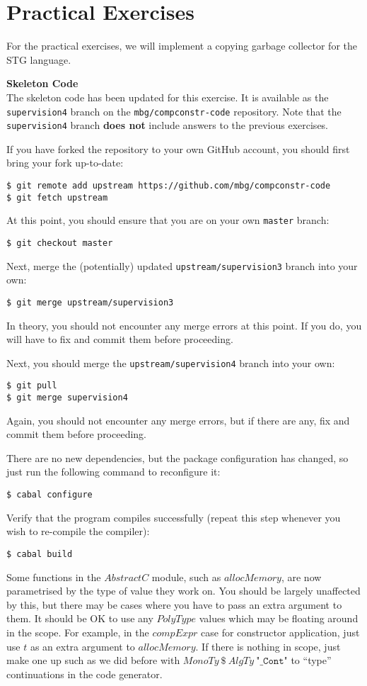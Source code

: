 \documentclass[10pt,a4paper]{exam} %
\begin{document}
\section*{Practical Exercises}

For the practical exercises, we will implement a copying garbage collector for the STG language.

\begin{mdframed}
\textbf{Skeleton Code}\\
The skeleton code has been updated for this exercise. It is available as the \texttt{supervision4} branch on the \texttt{mbg/compconstr-code} repository. Note that the \texttt{supervision4} branch \textbf{does not} include answers to the previous exercises.

If you have forked the repository to your own GitHub account, you should first bring your fork up-to-date:
\begin{verbatim}
$ git remote add upstream https://github.com/mbg/compconstr-code
$ git fetch upstream
\end{verbatim}
At this point, you should ensure that you are on your own \texttt{master} branch:
\begin{verbatim}
$ git checkout master
\end{verbatim}
Next, merge the (potentially) updated \texttt{upstream/supervision3} branch into your own:
\begin{verbatim}
$ git merge upstream/supervision3
\end{verbatim}
In theory, you should not encounter any merge errors at this point. If you do, you will have to fix and commit them before proceeding.

Next, you should merge the \texttt{upstream/supervision4} branch into your own:
\begin{verbatim}
$ git pull
$ git merge supervision4
\end{verbatim}
Again, you should not encounter any merge errors, but if there are any, fix and commit them before proceeding.

There are no new dependencies, but the package configuration has changed, so just run the following command to reconfigure it:
\begin{verbatim}
$ cabal configure
\end{verbatim}
Verify that the program compiles successfully (repeat this step whenever you wish to re-compile the compiler):
\begin{verbatim}
$ cabal build
\end{verbatim}
Some functions in the $\mathit{AbstractC}$ module, such as $\mathit{allocMemory}$, are now parametrised by the type of value they work on. You should be largely unaffected by this, but there may be cases where you have to pass an extra argument to them. It should be OK to use any $\mathit{PolyType}$ values which may be floating around in the scope. For example, in the $\mathit{compExpr}$ case for constructor application, just use $t$ as an extra argument to $\mathit{allocMemory}$. If there is nothing in scope, just make one up such as we did before with $\mathit{MonoTy}~\$~\mathit{AlgTy}~\texttt{"\_Cont"}$ to ``type'' continuations in the code generator.


\end{mdframed}
\end{document}
